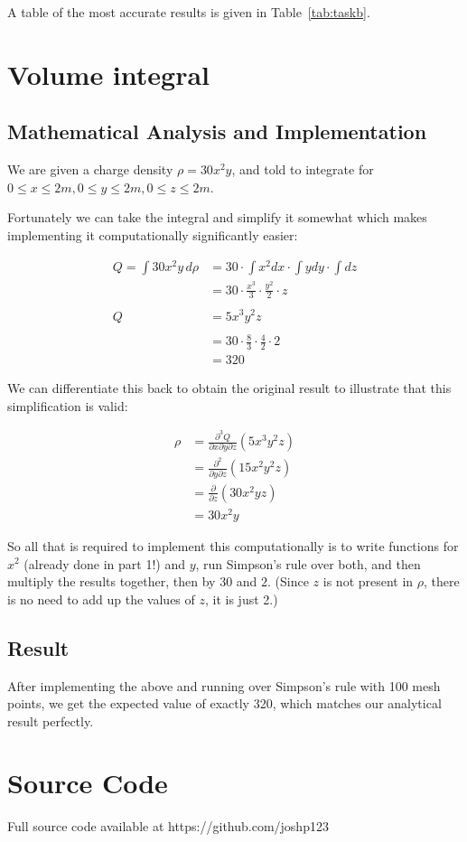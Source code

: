 \documentclass[10pt,fleqn,a4paper]{article} %
\renewcommand{\=}[1]{\stackrel{#1}{=}} %
\theoremstyle{definition}
\theoremstyle{remark}
\begin{document}
A table of the most accurate results is given in Table~\ref{tab:taskb}.

\section{Volume integral}
\subsection{Mathematical Analysis and Implementation}

We are given a charge density $\rho = 30 x^2 y$, and told to integrate for $ 0 \le x \le 2 m, 0 \le y \le 2 m, 0 \le z \le 2 m$.

Fortunately we can take the integral and simplify it somewhat which makes implementing it computationally significantly easier:

\begin{align*}
Q = \int 30 x^2 y \, d\rho & = 30 \cdot \int x^2 dx \cdot \int y dy \cdot \int dz\\
& = 30 \cdot \frac{x^3}{3} \cdot \frac{y^2}{2} \cdot z\\\\
Q & = 5 x^3 y^2 z \\\\
& = 30 \cdot \frac{8}{3} \cdot \frac{4}{2} \cdot 2\\
& = 320
\end{align*}

We can differentiate this back to obtain the original result to illustrate that this simplification is valid:

\begin{align*}
\rho & = \frac{\partial^3 Q}{\partial x \partial y \partial z}(5 x^3 y^2 z) \\
& = \frac{\partial^2 }{\partial y \partial z} (15 x ^2 y^2 z)\\
& = \frac{\partial}{\partial z} (30 x ^2 y z)\\
& = 30 x ^2 y 
\end{align*}

So all that is required to implement this computationally is to write functions for $x^2$ (already done in part 1!) and $y$, run Simpson's rule over both, and then multiply the results together, then by $30$ and $2$. (Since $z$ is not present in $\rho$, there is no need to add up the values of $z$, it is just 2.)

\subsection{Result}
After implementing the above and running over Simpson's rule with 100 mesh points, we get the expected value of exactly 320, which matches our analytical result perfectly.

\appendix
\section{Source Code}
Full source code available at https://github.com/joshp123
\end{document}
